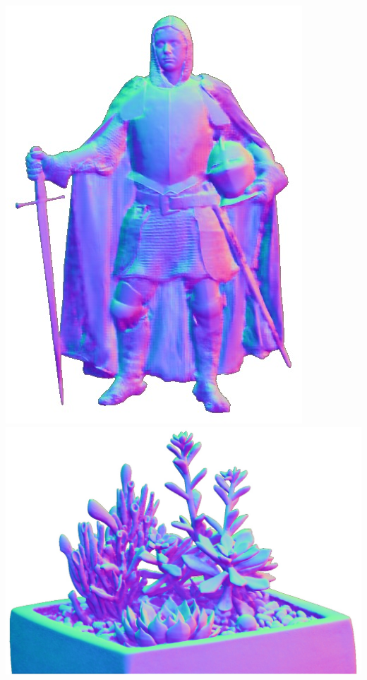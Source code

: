  \hspace{-0.2em}\includegraphics[height=0.183\textwidth]{ch-psfcn/images/Results/LightStage/PS-FCN_normalize/knight_standing_Normal_DiLiGenT.jpg}
 \hspace{-0.2em}\includegraphics[height=0.183\textwidth]{ch-psfcn/images/Results/LightStage/PS-FCN_normalize/plant_left_Normal_DiLiGenT.jpg}
 \\
 \\
